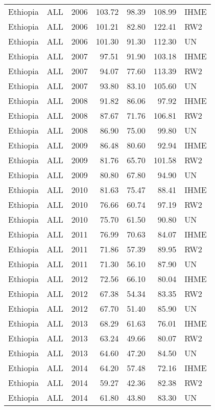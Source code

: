 \begin{longtable}{lllrrrl}
  Ethiopia & ALL & 2006 & 103.72 & 98.39 & 108.99 & IHME \\ 
  Ethiopia & ALL & 2006 & 101.21 & 82.80 & 122.41 & RW2 \\ 
  Ethiopia & ALL & 2006 & 101.30 & 91.30 & 112.30 & UN \\ 
  Ethiopia & ALL & 2007 & 97.51 & 91.90 & 103.18 & IHME \\ 
  Ethiopia & ALL & 2007 & 94.07 & 77.60 & 113.39 & RW2 \\ 
  Ethiopia & ALL & 2007 & 93.80 & 83.10 & 105.60 & UN \\ 
  Ethiopia & ALL & 2008 & 91.82 & 86.06 & 97.92 & IHME \\ 
  Ethiopia & ALL & 2008 & 87.67 & 71.76 & 106.81 & RW2 \\ 
  Ethiopia & ALL & 2008 & 86.90 & 75.00 & 99.80 & UN \\ 
  Ethiopia & ALL & 2009 & 86.48 & 80.60 & 92.94 & IHME \\ 
  Ethiopia & ALL & 2009 & 81.76 & 65.70 & 101.58 & RW2 \\ 
  Ethiopia & ALL & 2009 & 80.80 & 67.80 & 94.90 & UN \\ 
  Ethiopia & ALL & 2010 & 81.63 & 75.47 & 88.41 & IHME \\ 
  Ethiopia & ALL & 2010 & 76.66 & 60.74 & 97.19 & RW2 \\ 
  Ethiopia & ALL & 2010 & 75.70 & 61.50 & 90.80 & UN \\ 
  Ethiopia & ALL & 2011 & 76.99 & 70.63 & 84.07 & IHME \\ 
  Ethiopia & ALL & 2011 & 71.86 & 57.39 & 89.95 & RW2 \\ 
  Ethiopia & ALL & 2011 & 71.30 & 56.10 & 87.90 & UN \\ 
  Ethiopia & ALL & 2012 & 72.56 & 66.10 & 80.04 & IHME \\ 
  Ethiopia & ALL & 2012 & 67.38 & 54.34 & 83.35 & RW2 \\ 
  Ethiopia & ALL & 2012 & 67.70 & 51.40 & 85.90 & UN \\ 
  Ethiopia & ALL & 2013 & 68.29 & 61.63 & 76.01 & IHME \\ 
  Ethiopia & ALL & 2013 & 63.24 & 49.66 & 80.07 & RW2 \\ 
  Ethiopia & ALL & 2013 & 64.60 & 47.20 & 84.50 & UN \\ 
  Ethiopia & ALL & 2014 & 64.20 & 57.48 & 72.16 & IHME \\ 
  Ethiopia & ALL & 2014 & 59.27 & 42.36 & 82.38 & RW2 \\ 
  Ethiopia & ALL & 2014 & 61.80 & 43.80 & 83.30 & UN \\ 

\end{longtable}
